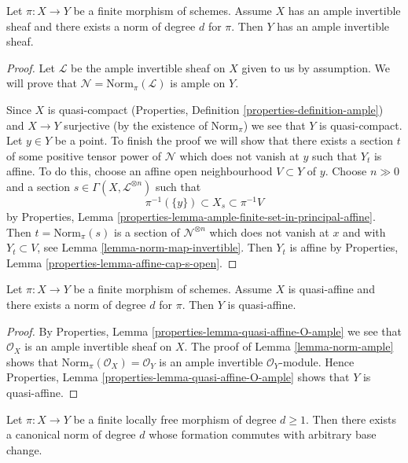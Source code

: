 \begin{lemma}
\label{lemma-norm-ample}
Let $\pi : X \to Y$ be a finite morphism of schemes. Assume $X$ has
an ample invertible sheaf and there exists a norm of degree $d$
for $\pi$. Then $Y$ has an ample invertible sheaf.
\end{lemma}

\begin{proof}
Let $\mathcal{L}$ be the ample invertible sheaf on $X$ given to us
by assumption. We will prove that $\mathcal{N} = \text{Norm}_\pi(\mathcal{L})$
is ample on $Y$.

\medskip\noindent
Since $X$ is quasi-compact (Properties, Definition
\ref{properties-definition-ample}) and $X \to Y$ surjective
(by the existence of $\text{Norm}_\pi$)
we see that $Y$ is quasi-compact.
Let $y \in Y$ be a point. To finish the proof
we will show that there exists a section $t$ of some positive tensor
power of $\mathcal{N}$ which does not vanish at $y$ such that $Y_t$
is affine. To do this, choose an affine open neighbourhood $V \subset Y$
of $y$. Choose $n \gg 0$ and a section
$s \in \Gamma(X, \mathcal{L}^{\otimes n})$
such that
$$
\pi^{-1}(\{y\}) \subset X_s \subset \pi^{-1}V
$$
by
Properties, Lemma \ref{properties-lemma-ample-finite-set-in-principal-affine}.
Then $t = \text{Norm}_\pi(s)$ is a section of $\mathcal{N}^{\otimes n}$
which does not vanish at $x$ and with $Y_t \subset V$, see
Lemma \ref{lemma-norm-map-invertible}. Then $Y_t$
is affine by Properties, Lemma \ref{properties-lemma-affine-cap-s-open}.
\end{proof}

\begin{lemma}
\label{lemma-norm-quasi-affine}
Let $\pi : X \to Y$ be a finite morphism of schemes. Assume $X$ is quasi-affine
and there exists a norm of degree $d$ for $\pi$. Then $Y$ is quasi-affine.
\end{lemma}

\begin{proof}
By Properties, Lemma \ref{properties-lemma-quasi-affine-O-ample}
we see that $\mathcal{O}_X$ is an ample invertible sheaf on $X$.
The proof of Lemma \ref{lemma-norm-ample} shows that
$\text{Norm}_\pi(\mathcal{O}_X) = \mathcal{O}_Y$
is an ample invertible $\mathcal{O}_Y$-module. Hence
Properties, Lemma \ref{properties-lemma-quasi-affine-O-ample}
shows that $Y$ is quasi-affine.
\end{proof}

\begin{lemma}
\label{lemma-finite-locally-free-has-norm}
Let $\pi : X \to Y$ be a finite locally free morphism of degree $d \geq 1$.
Then there exists a canonical norm of degree $d$ whose formation commutes
with arbitrary base change.
\end{lemma}

